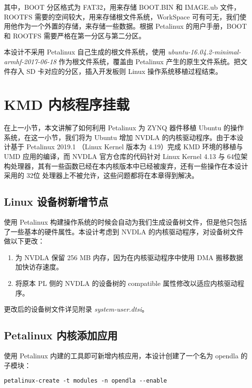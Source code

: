 其中，BOOT 分区格式为 FAT32，用来存储 BOOT.BIN 和 IMAGE.ub 文件，ROOTFS 需要的空间较大，用来存储根文件系统，WorkSpace 可有可无，我们使用他作为一个外置的存储，来存储一些数据。根据 Petalinux 的用户手册，BOOT 和 ROOTFS 需要严格在第一分区与第二分区。

本设计不采用 Petalinux 自己生成的根文件系统，使用 \emph{ubuntu-16.04.2-minimal-armhf-2017-06-18} 作为根文件系统，覆盖由 Petalinux 产生的原生文件系统。把文件存入 SD 卡对应的分区，插入开发板则 Linux 操作系统移植过程结束。

\section{KMD 内核程序挂载}

在上一小节，本文讲解了如何利用 Petalinux 为 ZYNQ 器件移植 Ubuntu 的操作系统，在这一小节，我们将为 Ubuntu 增加 NVDLA 的内核驱动程序。由于本设计基于 Petalinux 2019.1 （Linux Kernel 版本为 4.19）完成 KMD 环境的移植与 UMD 应用的编译，而 NVDLA 官方仓库的代码针对 Linux Kernel 4.13 与 64位架构处理器，其有一些函数已经在本内核版本中已经被废弃，还有一些操作在本设计采用的 32位 处理器上不被允许，这些问题都将在本章得到解决。

\subsection{Linux 设备树新增节点}

使用 Petalinux 构建操作系统的时候会自动为我们生成设备树文件，但是他只包括了一些基本的硬件属性。本设计考虑到 NVDLA 的内核驱动程序，对设备树文件做以下更改：

\begin{enumerate}
    \item 为 NVDLA 保留 256 MB 内存，因为在内核驱动程序中使用 DMA 搬移数据加快访存速度。
    \item 将原本 PL 侧的 NVDLA 的设备树的 compatible 属性修改以适应内核驱动程序。
\end{enumerate}

更改后的设备树文件详见附录 \emph{system-user.dtsi}。

\subsection{Petalinux 内核添加应用}

使用 Petalinux 内建的工具即可新增内核应用，本设计创建了一个名为 opendla 的子模块：

\begin{lstlisting}
petalinux-create -t modules -n opendla --enable
\end{lstlisting}

